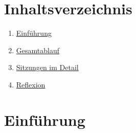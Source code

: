 \documentclass[
          a4paper,
        ]{article}
\providecommand{\tightlist}{%
  \setlength{\itemsep}{0pt}\setlength{\parskip}{0pt}}
\begin{document}
\pagestyle{plain}


\maketitle














\pagestyle{page}

\renewcommand{\arraystretch}{2}  %

\section{Inhaltsverzeichnis}\label{inhaltsverzeichnis}

\begin{enumerate}
\def\labelenumi{\arabic{enumi}.}
\tightlist
\item
  \hyperref[einfuxfchrung]{Einführung}
\item
  \hyperref[gesamtablauf]{Gesamtablauf}
\item
  \hyperref[lehreinheiten-im-detail]{Sitzungen im Detail}
\item
  \hyperref[reflexion]{Reflexion}
\end{enumerate}

\section{Einführung}\label{einfuxfchrung}
\end{document}
